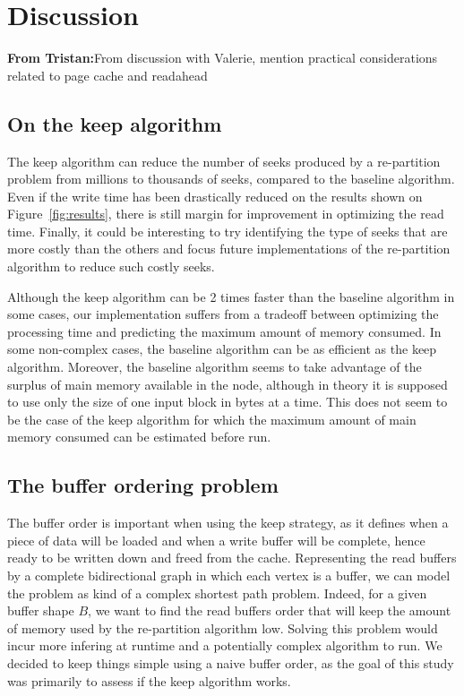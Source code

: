 \documentclass[sigconf, nonacm]{acmart}
\newcommand{\tristan}[1]{\color{orange}\textbf{From Tristan:}#1\color{black}}
\begin{document}
\section{Discussion}
\tristan{From discussion with Valerie, mention practical considerations related to page cache and readahead}

\subsection{On the keep algorithm}
The keep algorithm can reduce the number of seeks produced by a re-partition
problem from millions to thousands of seeks, compared to the baseline algorithm.
Even if the write time has been drastically reduced on the results shown on
Figure~\ref{fig:results}, there is still margin for improvement in optimizing
the read time.
Finally, it could be interesting to try identifying the type of seeks that are
more costly than the others and focus future implementations of the re-partition
algorithm to reduce such costly seeks.

Although the keep algorithm can be 2 times faster than the baseline algorithm
in some cases, our implementation suffers from a tradeoff between optimizing
the processing time and predicting the maximum amount of memory consumed.
In some non-complex cases, the baseline algorithm can be as efficient as the
keep algorithm.
Moreover, the baseline algorithm seems to take advantage of the surplus of
main memory available in the node, although in theory it is supposed to use
only the size of one input block in bytes at a time.
This does not seem to be the case of the keep algorithm for which the maximum
amount of main memory consumed can be estimated before run.

\subsection{The buffer ordering problem}
The buffer order is important when using the keep strategy, as it defines when
a piece of data will be loaded and when a write buffer will be complete, hence
ready to be written down and freed from the cache.
Representing the read buffers by a complete bidirectional graph in which each
vertex is a buffer, we can model the problem as kind of a complex shortest path
problem.
Indeed, for a given buffer shape $B$, we want to find the read buffers order
that will keep the amount of memory used by the re-partition algorithm low.
Solving this problem would incur more infering at runtime and a potentially
complex algorithm to run.
We decided to keep things simple using a naive buffer order, as the goal of
this study was primarily to assess if the keep algorithm works.
\end{document}
